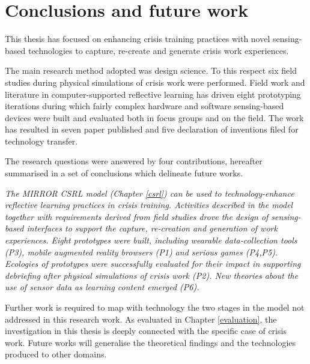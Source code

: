 \chapter{Conclusions and future work}\label{conclusions}


This thesis has focused on enhancing crisis training practices with novel sensing-based technologies to capture, re-create and generate crisis work experiences.

The main research method adopted was design science. To this respect six field studies during physical simulations of crisis work were performed. Field work and literature in computer-supported reflective learning has driven eight prototyping iterations during which fairly complex hardware and software sensing-based devices were built and evaluated both in focus groups and on the field. The work has resulted in seven paper published and five declaration of inventions filed for technology transfer.

The research questions were answered by four contributions, hereafter summarised in a set of conclusions which delineate future works. 
	
\begin{framed}
\emph{The MIRROR CSRL model (Chapter \ref{csrl}) can be used to technology-enhance reflective learning practices in crisis training. Activities described in the model together with requirements derived from field studies drove the design of sensing-based interfaces to support the capture, re-creation and generation of work experiences. Eight prototypes were built, including wearable data-collection tools (P3), mobile augmented reality browsers (P1) and serious games (P4,P5). Ecologies of prototypes were successfully evaluated for their impact in supporting debriefing after physical simulations of crisis work (P2). New theories about the use of sensor data as learning content emerged (P6).}
\par
Further work is required to map with technology the two stages in the model not addressed in this research work. As evaluated in Chapter \ref{evaluation}, the investigation in this thesis is deeply connected with the specific case of crisis work. Future works will generalise the theoretical findings and the technologies produced to other domains. 
\end{framed}

